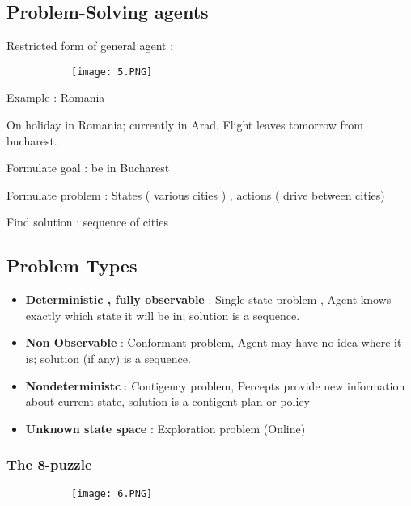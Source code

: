 \documentclass{article}
\begin{document}
\subsection{Problem-Solving agents}

Restricted form of general agent : 

\begin{figure}[ht!]
  \centering
  \begin{subfigure}[b]{0.6\linewidth}
    \texttt{[image: 5.PNG]}
  \end{subfigure}
\end{figure}

Example : Romania

On holiday in Romania; currently in Arad. Flight leaves tomorrow from bucharest.

Formulate goal : be in Bucharest

Formulate problem : States ( various cities ) , actions ( drive between cities)

Find solution : sequence of cities 

\subsection{Problem Types}

\begin{itemize}
    
    \item \textbf{Deterministic , fully observable} : Single state problem , Agent knows exactly which state it will be in; solution is a sequence.
    \item \textbf{Non Observable} : Conformant problem, Agent may have no idea where it is; solution (if any) is a sequence.
    \item \textbf{Nondeterministc} : Contigency problem, Percepts provide new information about current state, solution is a contigent plan or policy
    \item \textbf{Unknown state space} : Exploration problem (Online)
    
\end{itemize}

\subsubsection{The 8-puzzle}

\begin{figure}[ht!]
  \centering
  \begin{subfigure}[b]{0.6\linewidth}
    \texttt{[image: 6.PNG]}
  \end{subfigure}
\end{figure}
\end{document}
